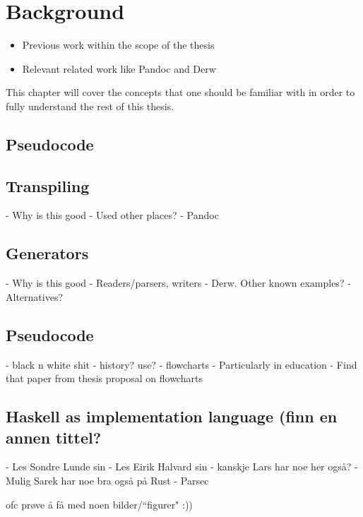 \chapter{Background} %
\begin{itemize}
    \item Previous work within the scope of the thesis
    \item Relevant related work like Pandoc and Derw
\end{itemize}

This chapter will cover the concepts that one should be familiar with in order to fully understand the rest of this thesis.

\section{Pseudocode}

\section{Transpiling}

- Why is this good
- Used other places?
- Pandoc

\section{Generators}

- Why is this good
- Readers/parsers, writers
- Derw. Other known examples?
- Alternatives?

\section{Pseudocode}

- black n white shit
- history? use?
- flowcharts
- Particularly in education
- Find that paper from thesis proposal on flowcharts

\section{Haskell as implementation language (finn en annen tittel?}

- Les Sondre Lunde sin
- Les Eirik Halvard sin
- kanskje Lars har noe her også?
- Mulig Sarek har noe bra også på Rust
- Parsec

ofc prøve å få med noen bilder/“figurer" :))


